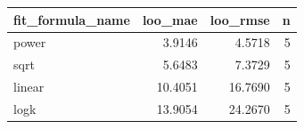 \begin{tabular}{lrrr}
\toprule
fit\_formula\_name & loo\_mae & loo\_rmse & n \\
\midrule
power & 3.9146 & 4.5718 & 5 \\
sqrt & 5.6483 & 7.3729 & 5 \\
linear & 10.4051 & 16.7690 & 5 \\
logk & 13.9054 & 24.2670 & 5 \\
\bottomrule
\end{tabular}
